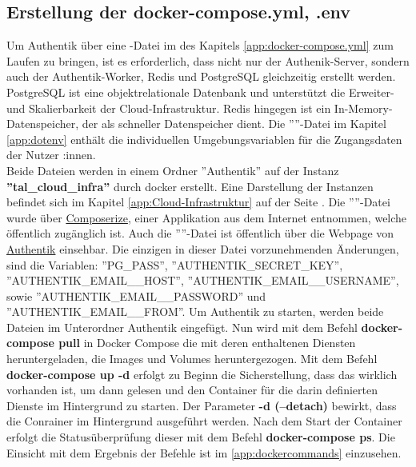 \subsection{Erstellung der docker-compose.yml, .env}
\label{sec:Erstellung der docker-compose.yml, .env}
Um Authentik über eine \textit{}-Datei im  des Kapitels \ref{app:docker-compose.yml} 
zum Laufen zu bringen, ist es erforderlich, dass nicht nur der Authenik-Server, sondern auch der Authentik-Worker, 
Redis und PostgreSQL gleichzeitig erstellt werden. PostgreSQL ist eine objektrelationale Datenbank und unterstützt 
die Erweiter- und Skalierbarkeit der Cloud-Infrastruktur. Redis hingegen ist ein In-Memory-Datenspeicher, der als 
schneller Datenspeicher dient. Die ''''-Datei im Kapitel \ref{app:dotenv}  
enthält die individuellen Umgebungsvariablen für die Zugangsdaten der Nutzer :innen. 
\\Beide Dateien werden in einem Ordner ''Authentik'' auf der Instanz \textbf{''tal\_cloud\_infra''} durch docker erstellt. 
Eine Darstellung der Instanzen befindet sich im Kapitel \ref{app:Cloud-Infrastruktur}   auf der Seite 
\pageref{app:Cloud-Infrastruktur}. Die ''''-Datei wurde über \href{https://www.composerize.com/}{Composerize}, einer 
Applikation aus dem Internet entnommen, welche öffentlich zugänglich ist. Auch die ''''-Datei ist öffentlich über die 
Webpage von \href{https://goauthentik.io/}{Authentik} einsehbar. Die einzigen in dieser Datei vorzunehmenden Änderungen, sind die Variablen: 
''PG\_PASS'', ''AUTHENTIK\_SECRET\_KEY'', ''AUTHENTIK\_EMAIL\_\_HOST'', ''AUTHENTIK\_EMAIL\_\_USERNAME'', sowie ''AUTHENTIK\_EMAIL\_\_PASSWORD'' 
und ''AUTHENTIK\_EMAIL\_\_FROM''. Um Authentik zu starten, werden beide Dateien im Unterordner Authentik eingefügt. Nun wird mit dem Befehl 
\textbf{docker-compose pull} in Docker Compose die \textbf{} mit deren enthaltenen Diensten heruntergeladen, 
die Images und Volumes heruntergezogen. Mit dem Befehl \textbf{docker-compose up -d} erfolgt zu Beginn die Sicherstellung, dass das 
 wirklich vorhanden ist, um dann gelesen und den Container für die darin definierten Dienste im Hintergrund zu starten. Der 
Parameter \textbf{-d (--detach)} bewirkt, dass die Conrainer im Hintergrund ausgeführt werden. Nach dem Start der Container erfolgt die Statusüberprüfung dieser 
mit dem Befehl \textbf{docker-compose ps}. Die Einsicht mit dem Ergebnis der Befehle ist im  \ref{app:dockercommands} 
 einzusehen.

